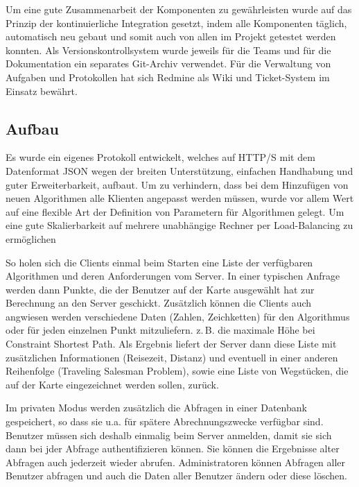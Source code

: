 Um eine gute Zusammenarbeit der Komponenten zu gewährleisten wurde auf das Prinzip der kontinuierliche Integration gesetzt, indem alle Komponenten täglich, automatisch neu gebaut und somit auch von allen im Projekt getestet werden konnten.
Als Versionskontrollsystem wurde jeweils für die Teams und für die Dokumentation ein separates Git-Archiv verwendet. Für die Verwaltung von Aufgaben und Protokollen hat sich Redmine als Wiki und Ticket-System im Einsatz bewährt.

\subsection*{Aufbau}
Es wurde ein eigenes Protokoll entwickelt, welches auf \mbox{HTTP/S} mit dem Datenformat JSON wegen der breiten Unterstützung, einfachen Handhabung und guter Erweiterbarkeit, aufbaut. Um zu verhindern, dass bei dem Hinzufügen von neuen Algorithmen alle Klienten angepasst werden müssen, wurde vor allem Wert auf eine flexible Art der Definition von Parametern für Algorithmen gelegt. Um eine gute Skalierbarkeit auf mehrere unabhängige Rechner per Load-Balancing zu ermöglichen

So holen sich die Clients einmal beim Starten eine Liste der verfügbaren Algorithmen und deren Anforderungen vom Server. In einer typischen Anfrage werden dann Punkte, die der Benutzer auf der Karte ausgewählt hat zur Berechnung an den Server geschickt. Zusätzlich können die Clients auch angwiesen werden verschiedene Daten (Zahlen, Zeichketten) für den Algorithmus oder für jeden einzelnen Punkt mitzuliefern. z.\,B. die maximale Höhe bei Constraint Shortest Path. Als Ergebnis liefert der Server dann diese Liste mit zusätzlichen Informationen (Reisezeit, Distanz) und eventuell in einer anderen Reihenfolge (Traveling Salesman Problem), sowie eine Liste von Wegstücken, die auf der Karte eingezeichnet werden sollen, zurück.

Im privaten Modus werden zusätzlich die Abfragen in einer Datenbank gespeichert, so dass sie u.a. für spätere Abrechnungszwecke verfügbar sind. Benutzer müssen sich deshalb einmalig beim Server anmelden, damit sie sich dann bei jder Abfrage authentifizieren können. Sie können die Ergebnisse alter Abfragen auch jederzeit wieder abrufen. Administratoren können Abfragen aller Benutzer abfragen und auch die Daten aller Benutzer ändern oder diese löschen. 	